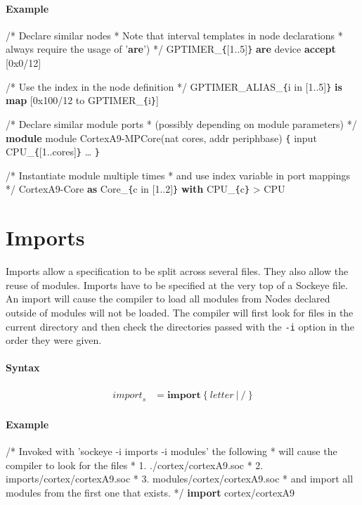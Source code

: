 \documentclass[a4paper,11pt,twoside]{report}
\begin{document}
{{{\paragraph{Example}
\begin{syntax}
    /* Declare similar nodes
     * Note that interval templates in node declarations
     * always require the usage of '\textbf{are}')
     */
    GPTIMER_\verb+{+[1..5]\verb+}+ \textbf{are} device \textbf{accept} [0x0/12]

    /* Use the index in the node definition */
    GPTIMER_ALIAS_\verb+{+i in [1..5]\verb+}+ \textbf{is} \textbf{map} [0x100/12 to GPTIMER_\verb+{+i\verb+}+]

    /* Declare similar module ports
     * (possibly depending on module parameters)
     */
    \textbf{module} module CortexA9-MPCore(nat cores, addr periphbase) \verb+{+
        input CPU_\verb+{+[1..cores]\verb+}+
        \ldots
    \verb+}+

    /* Instantiate module multiple times
     * and use index variable in port mappings
     */
    CortexA9-Core \textbf{as} Core_\verb+{+c in [1..2]\verb+}+ \textbf{with}
        CPU_\verb+{+c\verb+}+ > CPU
\end{syntax}

\section{Imports}
\label{sec:imports}
Imports allow a specification to be split across several files.
They also allow the reuse of modules.
Imports have to be specified at the very top of a Sockeye file.
An import will cause the compiler to load all modules from 
Nodes declared outside of modules will not be loaded.
The compiler will first look for files in the current directory and then check the directories passed with the \texttt{-i} option in the order they were given.

\paragraph{Syntax}
\begin{align*}
\textit{import}_s & \mathop{=}
    \textbf{import}\ \big\{\ \textit{letter}\ |\ \textbf{/}\ \big\}
\end{align*}

\paragraph{Example}
\begin{syntax}
    /* Invoked with 'sockeye -i imports -i modules' the following
     * will cause the compiler to look for the files
     * 1. ./cortex/cortexA9.soc
     * 2. imports/cortex/cortexA9.soc
     * 3. modules/cortex/cortexA9.soc
     * and import all modules from the first one that exists.
     */
    \textbf{import} cortex/cortexA9
\end{syntax}

}}}
\end{document}

